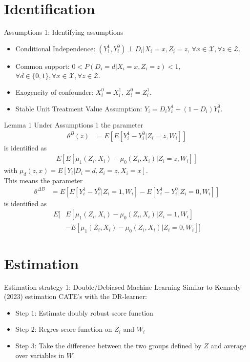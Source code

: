 \documentclass{beamer}\usepackage{listings}
\begin{document}
\section{Identification}
\label{sec:org7dda87d}

\begin{frame}[label={sec:org6d0aae0}]{Assumptions 1: Identifying assumptions}
\begin{itemize}
\item Conditional Independence: \((Y^1_i,Y^0_i)\perp D_i\vert X_i = x,Z_i = z\),   \(\forall x\in\mathcal{X},\forall z\in\mathcal{Z}\).
\item Common support: \(0<P(D_i = d\vert X_i = x,Z_i = z)<1\),   \(\forall d\in\{0,1\},\forall x\in\mathcal{X},\forall z\in\mathcal{Z}\).
\item Exogeneity of confounder: \(X^0_i = X^1_i\), \(Z^0_i = Z^1_i\).
\item Stable Unit Treatment Value Assumption: \(Y_i = D_iY^1_i+(1-D_i)Y^0_i\).
\end{itemize}
\end{frame}

\begin{frame}[label={sec:org91676fc}]{Lemma 1}
Under Assumptions 1 the parameter
\begin{align*}
\theta^B(z) &= E[E[Y^1_i-Y^0_i\vert Z_i = z,W_i]]
\end{align*}
is identified as
\begin{align*}
E[E[\mu_1(Z_i,X_i)-\mu_0(Z_i,X_i)\vert Z_i = z,W_i]]
\end{align*}
with \(\mu_d(z,x) = E[Y_i\vert D_i = d,Z_i = z,X_i = x]\).\pause\\[0pt]
This means the parameter
\begin{align*}
\theta^{\Delta B} &= E[E[Y^1_i-Y^0_i\vert Z_i = 1,W_i]-E[Y^1_i-Y^0_i\vert Z_i = 0,W_i]]
\end{align*}
is identified as
\begin{align*}
E[&E[\mu_1(Z_i,X_i)-\mu_0(Z_i,X_i)\vert Z_i = 1,W_i]\\
&-E[\mu_1(Z_i,X_i)-\mu_0(Z_i,X_i)\vert Z_i = 0,W_i]]
\end{align*}
\end{frame}

\section{Estimation}
\label{sec:orgc212c32}

\begin{frame}[label={sec:orgf66d12f}]{Estimation strategy 1: Double/Debiased Machine Learning}
Similar to Kennedy (2023) estimation CATE's with the DR-learner:
\begin{itemize}
\item Step 1: Estimate doubly robust score function
\item Step 2: Regres score function on \(Z_i\) and \(W_i\)
\item Step 3: Take the difference between the two groups defined by \(Z\) and average over variables in \(W\).
\end{itemize}
\end{frame}
\end{document}
